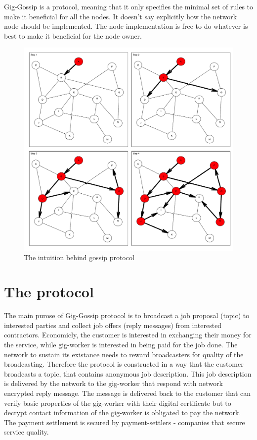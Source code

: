 \documentclass{article}
\begin{document}
Gig-Gossip is a protocol, meaning that it only specifies the minimal set of rules to make it beneficial for all the nodes. It doesn't say explicitly how the network node should be implemented. The node implementation is free to do whatever is best to make it beneficial for the node owner.

\begin{figure}
	\centering
	\includegraphics[scale=0.4]{network.pdf}
	\caption{The intuition behind gossip protocol}
	\label{fig:network}
\end{figure}

\section{The protocol}

The main purose of Gig-Gossip protocol is to broadcast a job proposal (topic) to interested parties and collect job offers (reply messages) from interested contractors. Economicly, the customer is interested in exchanging their money for the service, while gig-worker is interested in being paid for the job done. The network to sustain its existance needs to reward broadcasters for quality of the broadcasting. Therefore the protocol is constructed in a way that the customer broadcasts a topic, that contains anonymous job description. This job description is delivered by the network to the gig-worker that respond with network encrypted reply message. The message is delivered back to the customer that can verify basic properties of the gig-worker with their digital certificate but to decrypt contact information of the gig-worker is obligated to pay the network. The payment settlement is secured by payment-settlers - companies that secure service quality.
\end{document}
